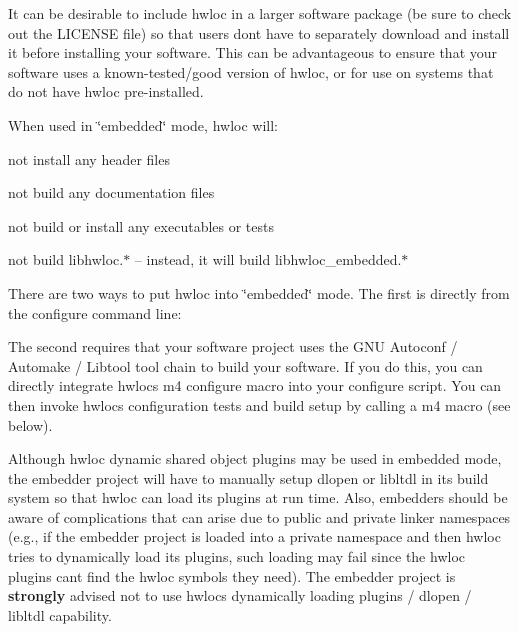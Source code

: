 

It can be desirable to include hwloc in a larger software package (be sure to check out the L\+I\+C\+E\+N\+SE file) so that users don\textquotesingle{}t have to separately download and install it before installing your software. This can be advantageous to ensure that your software uses a known-\/tested/good version of hwloc, or for use on systems that do not have hwloc pre-\/installed.

When used in \char`\"{}embedded\char`\"{} mode, hwloc will\+:


\begin{DoxyItemize}
\item not install any header files
\item not build any documentation files
\item not build or install any executables or tests
\item not build {\ttfamily libhwloc.$\ast$} -- instead, it will build {\ttfamily libhwloc\+\_\+embedded.$\ast$}
\end{DoxyItemize}

There are two ways to put hwloc into \char`\"{}embedded\char`\"{} mode. The first is directly from the configure command line\+:



The second requires that your software project uses the G\+NU Autoconf / Automake / Libtool tool chain to build your software. If you do this, you can directly integrate hwloc\textquotesingle{}s m4 configure macro into your configure script. You can then invoke hwloc\textquotesingle{}s configuration tests and build setup by calling a m4 macro (see below).

Although hwloc dynamic shared object plugins may be used in embedded mode, the embedder project will have to manually setup dlopen or libltdl in its build system so that hwloc can load its plugins at run time. Also, embedders should be aware of complications that can arise due to public and private linker namespaces (e.\+g., if the embedder project is loaded into a private namespace and then hwloc tries to dynamically load its plugins, such loading may fail since the hwloc plugins can\textquotesingle{}t find the hwloc symbols they need). The embedder project is {\bfseries strongly} advised not to use hwloc\textquotesingle{}s dynamically loading plugins / dlopen / libltdl capability.


